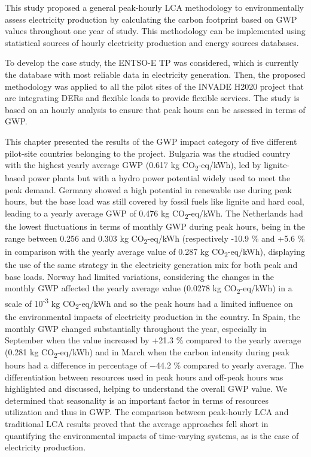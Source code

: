 {{{{This study  proposed a general peak-hourly LCA methodology to environmentally assess electricity production by calculating the carbon footprint based on GWP values throughout one year of study. This methodology can be implemented using statistical sources of hourly electricity production and energy sources databases. 

To develop the case study, the ENTSO-E TP was considered, which is currently the database with most reliable data in electricity generation. Then, the proposed methodology was applied to all the pilot sites of the INVADE H2020 project that are integrating DERs and flexible loads to provide flexible services. The study is based on an hourly analysis to ensure that peak hours can be assessed in terms of GWP. 

This chapter presented the results of the GWP impact category of five different pilot-site countries belonging to the project. Bulgaria was the studied country with the highest yearly average GWP (0.617 kg CO\textsubscript2-eq/kWh), led by lignite-based power plants but with a hydro power potential widely used to meet the peak demand. Germany showed a high potential in renewable use during peak hours, but the base load was still covered by fossil fuels like lignite and hard coal, leading to a yearly average GWP of 0.476 kg CO\textsubscript2-eq/kWh. The Netherlands had the lowest fluctuations in terms of monthly GWP during peak hours, being in the range between 0.256 and 0.303 kg CO\textsubscript2-eq/kWh (respectively -10.9 \% and +5.6 \% in comparison with the yearly average value of 0.287 kg CO\textsubscript2-eq/kWh), displaying the use of the same strategy in the electricity generation mix for both peak and base loads. Norway had limited variations, considering the changes in the monthly GWP affected the yearly average value (0.0278 kg CO\textsubscript2-eq/kWh) in a scale of 10\textsuperscript{-3} kg CO\textsubscript2-eq/kWh and so the peak hours had a limited influence on the environmental impacts of electricity production in the country. In Spain, the monthly GWP changed substantially throughout the year, especially in September when the value increased by +21.3 \% compared to the yearly average (0.281 kg CO\textsubscript2-eq/kWh) and in March when the carbon intensity during peak hours had a difference in percentage of $-$44.2 \% compared to yearly average. The differentiation between resources used in peak hours and off-peak hours was highlighted and discussed, helping to understand the overall GWP value. We determined that seasonality is an important factor in terms of resources utilization and thus in GWP. The comparison between peak-hourly LCA and traditional LCA results proved that the average approaches fell short in quantifying the environmental impacts of time-varying systems, as is the case of electricity production.

}}}}
